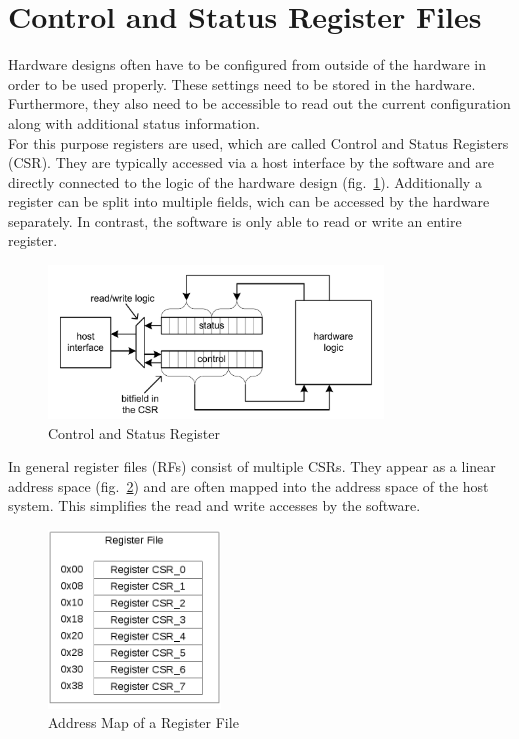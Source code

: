 \section{Control and Status Register Files}
Hardware designs often have to be configured from outside of the hardware in order to be used properly. These settings need to be stored in the hardware. Furthermore, they also need to be accessible to read out the current configuration along with additional status information.\\
For this purpose registers are used, which are called Control and Status Registers (CSR). They are typically accessed via a host interface by the software and are directly connected to the logic of the hardware design (fig.~\ref{fig::csr}). Additionally a register can be split into multiple fields, wich can be accessed by the hardware separately. In contrast, the software is only able to read or write an entire register.
\begin{figure}[h]
 \centering
 \includegraphics[width=252pt]{images/csr.png}
 \caption{Control and Status Register \cite{leber_diss}}
\label{fig::csr}
\end{figure}

In general register files (RFs) consist of multiple CSRs. They appear as a linear address space (fig.~\ref{fig::rf}) and are often mapped into the address space of the host system. This simplifies the read and write accesses by the software.
\begin{figure}[h]
 \centering
 \includegraphics[width=130pt]{images/rf.png}
 \caption{Address Map of a Register File}
\label{fig::rf}
\end{figure}
